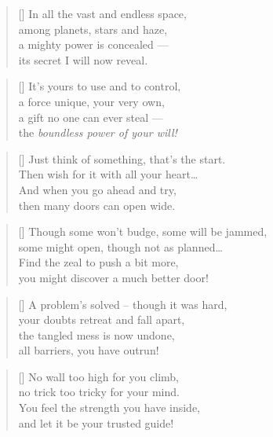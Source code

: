 \begin{verse}[\versewidth]
	In all the vast and endless space, \\
	among planets, stars and haze, \\
	a mighty power is concealed --- \\
	its secret I will now reveal.
\end{verse}

\begin{verse}[\versewidth]
	It's yours to use and to control, \\
	a force unique, your very own, \\
	a gift no one can ever steal --- \\
	the \emph{boundless power of your will!}
\end{verse}

\begin{verse}[\versewidth]
	Just think of something, that's the start. \\
	Then wish for it with all your heart\ldots\\
	And when you go ahead and try, \\
	then many doors can open wide.
\end{verse}

\begin{verse}[\versewidth]
	Though some won't budge, some will be jammed, \\
	some might open, though not as planned\ldots \\
	Find the zeal to push a bit more, \\
	you might discover a much better door!
\end{verse}

\begin{verse}[\versewidth]
	A problem's solved -- though it was hard, \\
	your doubts retreat and fall apart, \\
	the tangled mess is now undone, \\
	all barriers, you have outrun!
\end{verse}

\begin{verse}[\versewidth]
	No wall too high for you climb, \\
	no trick too tricky for your mind. \\
	You feel the strength you have inside, \\
	and let it be your trusted guide!
\end{verse}

